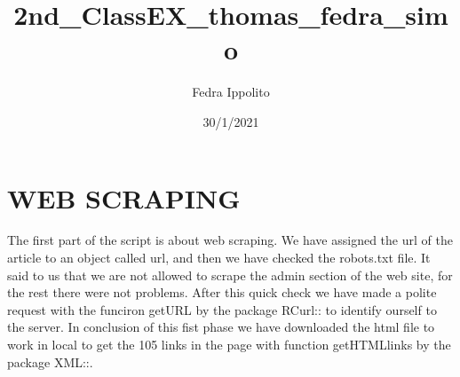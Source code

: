\documentclass[
]{article}
\title{2nd\_ClassEX\_thomas\_fedra\_simo}
\author{Fedra Ippolito}
\date{30/1/2021}
\newenvironment{Shaded}{\begin{snugshade}}{\end{snugshade}}
\newcommand{\CommentTok}[1]{\textcolor[rgb]{0.56,0.35,0.01}{\textit{#1}}}
\newcommand{\DataTypeTok}[1]{\textcolor[rgb]{0.13,0.29,0.53}{#1}}
\newcommand{\KeywordTok}[1]{\textcolor[rgb]{0.13,0.29,0.53}{\textbf{#1}}}
\newcommand{\NormalTok}[1]{#1}
\newcommand{\OperatorTok}[1]{\textcolor[rgb]{0.81,0.36,0.00}{\textbf{#1}}}
\newcommand{\StringTok}[1]{\textcolor[rgb]{0.31,0.60,0.02}{#1}}
\begin{document}
\maketitle

\hypertarget{web-scraping}{%
\section{WEB SCRAPING}\label{web-scraping}}

The first part of the script is about web scraping. We have assigned the
url of the article to an object called url, and then we have checked the
robots.txt file. It said to us that we are not allowed to scrape the
admin section of the web site, for the rest there were not problems.
After this quick check we have made a polite request with the funciron
getURL by the package RCurl:: to identify ourself to the server. In
conclusion of this fist phase we have downloaded the html file to work
in local to get the 105 links in the page with function getHTMLlinks by
the package XML::.

\begin{Shaded}
\end{Shaded}
\end{document}
